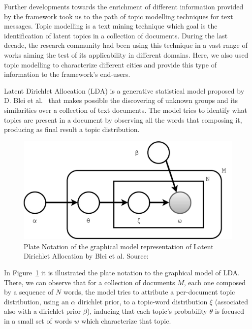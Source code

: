 Further developments towards the enrichment of different information provided by the framework took us to the path of topic modelling techniques for text messages. Topic modelling is a text mining technique which goal is the identification of latent topics in a collection of documents. During the last decade, the research community had been using this technique in a vast range of works aiming the test of its applicability in different domains. Here, we also used topic modelling to characterize different cities and provide this type of information to the framework's end-users.

Latent Dirichlet Allocation (\gls{LDA}) is a generative statistical model proposed by D. Blei et al.~\cite{blei2003latent} that makes possible the discovering of unknown groups and its similarities over a collection of text documents. The model tries to identify what topics are present in a document by observing all the words that composing it, producing as final result a topic distribution. 

\begin{figure}[htbp]
	\centering
	\includegraphics[scale=0.41, keepaspectratio]{figures/lda-model.pdf}
	\caption[Plate notation of \gls{LDA} by Blei et al. ~\cite{blei2003latent}]{Plate Notation of the graphical model representation of Latent Dirichlet Allocation by Blei et al. Source:~\cite{blei2003latent}}
	\label{fig:lda_graphical_model_representation}
\end{figure}

In Figure~\ref{fig:lda_graphical_model_representation} it is illustrated the plate notation to the graphical model of \gls{LDA}. There, we can observe that for a collection of documents $M$, each one composed by a sequence of $N$ words, the model tries to attribute a per-document topic distribution, using an $\alpha$ dirichlet prior, to a topic-word distribution $\xi$ (associated also with a dirichlet prior $\beta$), inducing that each topic's probability $\theta$ is focused in a small set of words $w$ which characterize that topic.

